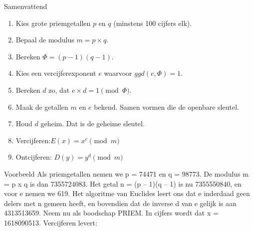 \documentclass{beamer}
\begin{document}
\begin{frame}{Samenvattend}
	\begin{enumerate}
		\item Kies grote priemgetallen $p$ en $q$ (minstens 100 cijfers elk).
		\item Bepaal de modulus $m = p \times q$.
		\item Bereken $\Phi = (p-1)(q-1)$.
		\item Kies een vercijferexponent $e$ waarvoor $ggd(e,\Phi) = 1$.
		\item Bereken $d$ zo, dat $e \times d = 1 \pmod{\Phi}$.
		\item Maak de getallen $m$ en $e$ bekend. Samen vormen die de openbare sleutel.
		\item Houd $d$ geheim. Dat is de geheime sleutel.
		\item Vercijferen:$ E(x) = x^e \pmod{m}$
		\item Ontcijferen: $D(y) = y^d \pmod{m}$
	\end{enumerate}
\end{frame}

\begin{frame}{Voorbeeld}
	 Als priemgetallen nemen we p = 74471 en q = 98773. 
	 \pause
	 De modulus m = p x q is dan 7355724083. Het getal n = (p – 1)(q – 1) is nu 7355550840, en voor e nemen we 619. Het algoritme van Euclides leert ons dat e inderdaad geen delers met n gemeen heeft, en bovendien dat de inverse d van e gelijk is aan 4313513659. Neem nu als boodschap PRIEM. In cijfers wordt dat x = 1618090513. Vercijferen levert:
\end{frame}



\end{document}
